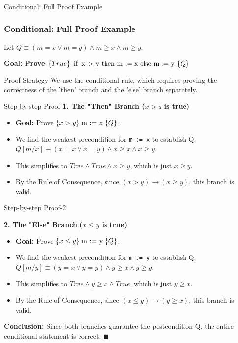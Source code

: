 \documentclass[aspectratio=169]{beamer}
\newcommand{\code}[1]{\lstinline|#1|}
\newcommand{\hoare}[3]{\ensuremath{\{#1\}\ \code{#2}\ \{#3\}}}
\begin{document}
\begin{frame}{Conditional: Full Proof Example}
    \frametitle{Conditional: Full Proof Example}
    Let $Q \equiv (m=x \lor m=y) \land m \ge x \land m \ge y$.
    
    \textbf{Goal: Prove \hoare{True}{if x > y then m := x else m := y}{Q}}
    
    \begin{block}{Proof Strategy}
        We use the conditional rule, which requires proving the correctness of the 'then' branch and the 'else' branch separately.
    \end{block}
    
\end{frame}
\begin{frame}{Step-by-step Proof}
        \textbf{1. The "Then" Branch ($x > y$ is true)}
        \begin{itemize}
            \item \textbf{Goal:} Prove \hoare{x > y}{m := x}{Q}.
            \item We find the weakest precondition for \code{m := x} to establish Q:
            $Q[m/x] \equiv (x=x \lor x=y) \land x \ge x \land x \ge y$.
            \item This simplifies to $True \land True \land x \ge y$, which is just $x \ge y$.
            \item By the Rule of Consequence, since $(x>y) \rightarrow (x \ge y)$, this branch is valid.
        \end{itemize}

\end{frame}
\begin{frame}{Step-by-step Proof-2}
    
        \textbf{2. The "Else" Branch ($x \le y$ is true)}
        \begin{itemize}
            \item \textbf{Goal:} Prove \hoare{x \le y}{m := y}{Q}.
            \item We find the weakest precondition for \code{m := y} to establish Q:
            $Q[m/y] \equiv (y=x \lor y=y) \land y \ge x \land y \ge y$.
            \item This simplifies to $True \land y \ge x \land True$, which is just $y \ge x$.
            \item By the Rule of Consequence, since $(x \le y) \rightarrow (y \ge x)$, this branch is valid.
        \end{itemize}
    \vfill
    \textbf{Conclusion:} Since both branches guarantee the postcondition Q, the entire conditional statement is correct. $\blacksquare$
\end{frame}
\end{document}
